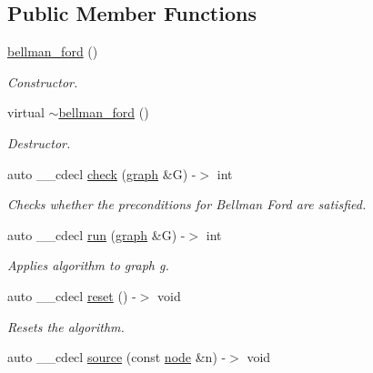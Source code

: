 \subsection*{Public Member Functions}
\begin{DoxyCompactItemize}
\item 
\mbox{\label{classbellman__ford_ae732e7ea1c63e3ed64779b31a3a9a208}} 
\mbox{\hyperlink{classbellman__ford_ae732e7ea1c63e3ed64779b31a3a9a208}{bellman\+\_\+ford}} ()
\begin{DoxyCompactList}\small\item\em Constructor. \end{DoxyCompactList}\item 
\mbox{\label{classbellman__ford_a8461c6b8d7663b05a97b6d270347a49c}} 
virtual \mbox{\hyperlink{classbellman__ford_a8461c6b8d7663b05a97b6d270347a49c}{$\sim$bellman\+\_\+ford}} ()
\begin{DoxyCompactList}\small\item\em Destructor. \end{DoxyCompactList}\item 
auto \+\_\+\+\_\+cdecl \mbox{\hyperlink{classbellman__ford_a7aadad38ac3fcccc8dee69896e183ccc}{check}} (\mbox{\hyperlink{classgraph}{graph}} \&G) -\/$>$ int
\begin{DoxyCompactList}\small\item\em Checks whether the preconditions for Bellman Ford are satisfied. \end{DoxyCompactList}\item 
auto \+\_\+\+\_\+cdecl \mbox{\hyperlink{classbellman__ford_a2c15782095c4fc37eb2a8d66c431c821}{run}} (\mbox{\hyperlink{classgraph}{graph}} \&G) -\/$>$ int
\begin{DoxyCompactList}\small\item\em Applies algorithm to graph g. \end{DoxyCompactList}\item 
auto \+\_\+\+\_\+cdecl \mbox{\hyperlink{classbellman__ford_a6aa4092aaa71b77d634749ded48068e9}{reset}} () -\/$>$ void
\begin{DoxyCompactList}\small\item\em Resets the algorithm. \end{DoxyCompactList}\item 
auto \+\_\+\+\_\+cdecl \mbox{\hyperlink{classbellman__ford_a6b371e1520ff9f9c19f6eba10c2b55cd}{source}} (const \mbox{\hyperlink{classnode}{node}} \&n) -\/$>$ void

\end{DoxyCompactItemize}
